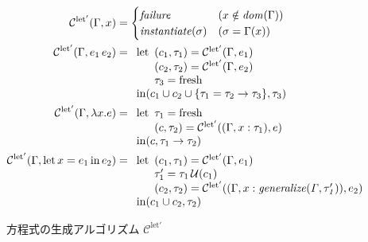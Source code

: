 \begin{figure}[htbp]
  \begin{align*}
    \mathcal C^\mathrm{let'}(\Gamma, x) &=
    \begin{cases}
      \mathit{failure} & (x \notin \mathit{dom}(\Gamma)) \\
      \mathit{instantiate}(\sigma) & (\sigma = \Gamma(x))
    \end{cases} \\
    \mathcal C^\mathrm{let'}(\Gamma, e_1 \, e_2) &=
    \begin{array}[t]{l}
      \mathrm{let}
        \begin{array}[t]{l}
          (c_1, \tau_1) = \mathcal C^\mathrm{let'}(\Gamma, e_1) \\
          (c_2, \tau_2) = \mathcal C^\mathrm{let'}(\Gamma, e_2) \\
          \tau_3 = \mathrm{fresh}
        \end{array} \\
      \mathrm{in} (c_1 \cup c_2 \cup \{\tau_1 = \tau_2 \to \tau_3\}, \tau_3)
    \end{array} \\
    \mathcal C^\mathrm{let'}(\Gamma, \lambda x . e) &=
    \begin{array}[t]{l}
      \mathrm{let}
        \begin{array}[t]{l}
          \tau_1 = \mathrm{fresh} \\
          (c, \tau_2) = \mathcal C^\mathrm{let'}((\Gamma, x : \tau_1), e)
        \end{array} \\
      \mathrm{in} (c, \tau_1 \to \tau_2)
    \end{array} \\
    \mathcal C^\mathrm{let'}(\Gamma, \mathrm{let} \, x = e_1 \, \mathrm{in} \, e_2) &=
    \begin{array}[t]{l}
      \mathrm{let}
        \begin{array}[t]{l}
          (c_1, \tau_1) = \mathcal C^\mathrm{let'}(\Gamma, e_1) \\
          \tau_1'       = \tau_1 \, \mathcal U(c_1) \\
          (c_2, \tau_2) = \mathcal C^\mathrm{let'}((\Gamma, x : \mathit{generalize(\Gamma, \tau_1')}) , e_2)
        \end{array} \\
      \mathrm{in} (c_1 \cup c_2, \tau_2)
    \end{array}
  \end{align*}
  \caption{方程式の生成アルゴリズム $\mathcal C^\mathrm{let'}$}
  \label{fig:algorithm-c-let2}
\end{figure}

